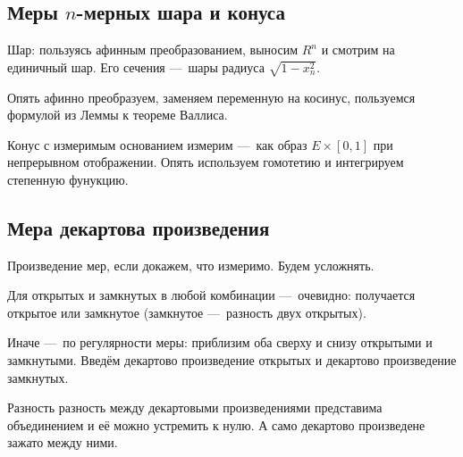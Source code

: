 \documentclass[12pt, a4paper, oneside]{memoir}
\begin{document}
\subsection{Меры $n$-мерных шара и конуса}

Шар: пользуясь афинным преобразованием, выносим $R^n$ и смотрим на единичный шар. 
Его сечения — шары радиуса $\sqrt{1 - x_n^2}$.

Опять афинно преобразуем, заменяем переменную на косинус, пользуемся формулой из Леммы к теореме Валлиса.


Конус с измеримым основанием измерим — как образ $E × [0, 1]$ при непрерывном отображении.
Опять используем гомотетию и интегрируем степенную фунукцию.



\subsection{Мера декартова произведения}

Произведение мер, если докажем, что измеримо. Будем усложнять.

Для открытых и замкнутых в любой комбинации — очевидно: получается открытое или замкнутое (замкнутое — разность двух открытых).

Иначе — по регулярности меры: приблизим оба сверху и снизу открытыми и замкнутыми. Введём декартово произведение открытых и декартово произведение замкнутых.

Разность разность между декартовыми произведениями представима объединением и её можно устремить к нулю.
А само декартово произведене зажато между ними.
\end{document}

